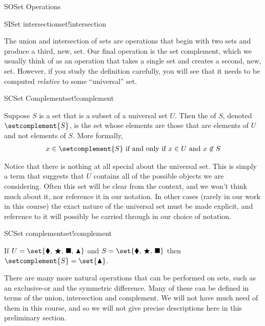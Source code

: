 \begin{subsect}{SO}{Set Operations}
\begin{example}{SI}{Set intersection}{set!intersection}
\end{example}
%
\begin{para}The union and intersection of sets are operations that begin with two sets and produce a third, new, set.  Our final operation is the set complement, which we usually think of as an operation that takes a single set and creates a second, new, set.  However, if you study the definition carefully, you will see that it needs to be computed {\em relative} to some ``universal'' set.\end{para}
%
\begin{definition}{SC}{Set Complement}{set!complement}
\begin{para}Suppose $S$ is a set that is a subset of a universal set $U$.  Then the  of $S$, denoted $\setcomplement{S}$, is the set whose elements are those that are elements of $U$ and not elements of $S$.  More formally,
%
\begin{align*}
x\in\setcomplement{S}\text{ if and only if }x\in U\text{ and }x\not\in S
\end{align*}
\end{para}
%
\end{definition}
%
\begin{para}Notice that there is nothing at all special about the universal set.  This is simply a term that suggests that $U$ contains all of the possible objects we are considering.  Often this set will be clear from the context, and we won't think much about it, nor reference it in our notation.  In other cases (rarely in our work in this course) the exact nature of the universal set must be made explicit, and reference to it will possibly be carried through in our choice of notation.\end{para}
%
\begin{example}{SC}{Set complement}{set!complement}
\begin{para}If $U=\set{\blacklozenge,\,\bigstar,\,\blacksquare,\,\blacktriangle}$ and $S=\set{\blacklozenge,\,\bigstar,\,\blacksquare}$ then $\setcomplement{S}=\set{\blacktriangle}$.\end{para}
\end{example}
%
\begin{para}There are many more natural operations that can be performed on sets, such as an exclusive-or and the symmetric difference.  Many of these can be defined in terms of the union, intersection and complement.  We will not have much need of them in this course, and so we will not give precise descriptions here in this preliminary section.\end{para}

\end{subsect}
